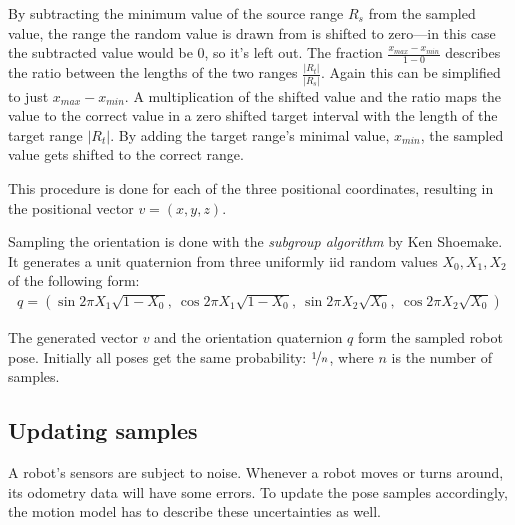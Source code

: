 \documentclass[Thesis.tex]{subfiles}
\begin{document}
By subtracting the minimum value of the source range $R_s$ from the sampled value, the range the random value is drawn from is shifted to zero---in this case the subtracted value would be $0$, so it's left out. The fraction $\frac{ x_{max} - x_{min} }{ 1 - 0 }$ describes the ratio between the lengths of the two ranges $\frac{|R_t|}{|R_s|}$. Again this can be simplified to just $x_{max}-x_{min}$. A multiplication of the shifted value and the ratio maps the value to the correct value in a zero shifted target interval with the length of the target range $|R_t|$. By adding the target range's minimal value, $x_{min}$, the sampled value gets shifted to the correct range.

This procedure is done for each of the three positional coordinates, resulting in the positional vector $v = \left(x, y, z\right)$.

Sampling the orientation is done with the \emph{subgroup algorithm} by Ken Shoemake\cite[p.~129-130]{gfxgems:1995}. It generates a unit quaternion from three uniformly \gls{iid} random values $X_0, X_1, X_2$ of the following form:
%
\begin{align}
q = \left( \sin{2\pi X_1}\sqrt{1-X_0},\: \cos{2\pi X_1}\sqrt{1-X_0},\: 
           \sin{2\pi X_2}\sqrt{  X_0},\: \cos{2\pi X_2}\sqrt{  X_0} \right)
\end{align}


The generated vector $v$ and the orientation quaternion $q$ form the sampled robot pose. Initially all poses get the same probability: $\nicefrac{1}{n}$, where $n$ is the number of samples.

\subsection{Updating samples}

A robot's sensors are subject to noise. Whenever a robot moves or turns around, its odometry data will have some errors.
To update the pose samples accordingly, the motion model has to describe these uncertainties as well.
\end{document}
